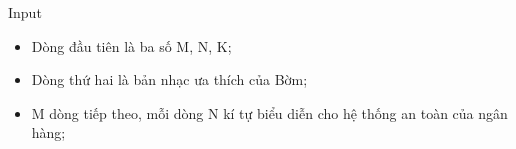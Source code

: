 Input  
\begin{itemize}
	\item     Dòng đầu tiên là ba số M, N, K;   
	\item     Dòng thứ hai là bản nhạc ưa thích của Bờm;   
	\item     M dòng tiếp theo, mỗi dòng N kí tự biểu diễn cho hệ thống an toàn của ngân hàng;   
\end{itemize}